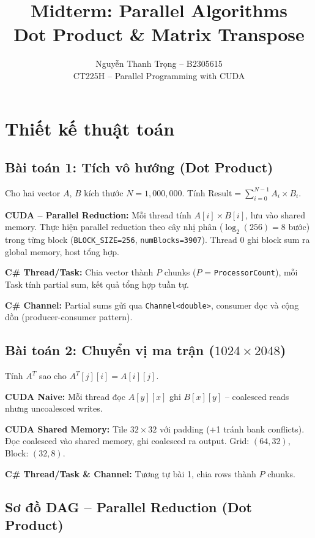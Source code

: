 \documentclass[12pt,a4paper]{article}
\title{\textbf{Midterm: Parallel Algorithms} \\ Dot Product \& Matrix Transpose}
\author{Nguyễn Thanh Trọng -- B2305615 \\ CT225H -- Parallel Programming with CUDA}
\date{}
\begin{document}
\maketitle
\thispagestyle{fancy}

\section{Thiết kế thuật toán}

\subsection{Bài toán 1: Tích vô hướng (Dot Product)}
Cho hai vector $A$, $B$ kích thước $N = 1{,}000{,}000$. Tính $\text{Result} = \sum_{i=0}^{N-1} A_i \times B_i$.

\textbf{CUDA -- Parallel Reduction:} Mỗi thread tính $A[i] \times B[i]$, lưu vào shared memory. Thực hiện parallel reduction theo cây nhị phân ($\log_2(256) = 8$ bước) trong từng block (\texttt{BLOCK\_SIZE=256}, \texttt{numBlocks=3907}). Thread 0 ghi block sum ra global memory, host tổng hợp.

\textbf{C\# Thread/Task:} Chia vector thành $P$ chunks ($P$ = \texttt{ProcessorCount}), mỗi Task tính partial sum, kết quả tổng hợp tuần tự.

\textbf{C\# Channel:} Partial sums gửi qua \texttt{Channel<double>}, consumer đọc và cộng dồn (producer-consumer pattern).

\subsection{Bài toán 2: Chuyển vị ma trận ($1024 \times 2048$)}
Tính $A^T$ sao cho $A^T[j][i] = A[i][j]$.

\textbf{CUDA Naive:} Mỗi thread đọc $A[y][x]$ ghi $B[x][y]$ -- coalesced reads nhưng uncoalesced writes.

\textbf{CUDA Shared Memory:} Tile $32 \times 32$ với padding (+1 tránh bank conflicts). Đọc coalesced vào shared memory, ghi coalesced ra output. Grid: $(64, 32)$, Block: $(32, 8)$.

\textbf{C\# Thread/Task \& Channel:} Tương tự bài 1, chia rows thành $P$ chunks.

\subsection{Sơ đồ DAG -- Parallel Reduction (Dot Product)}
\end{document}
